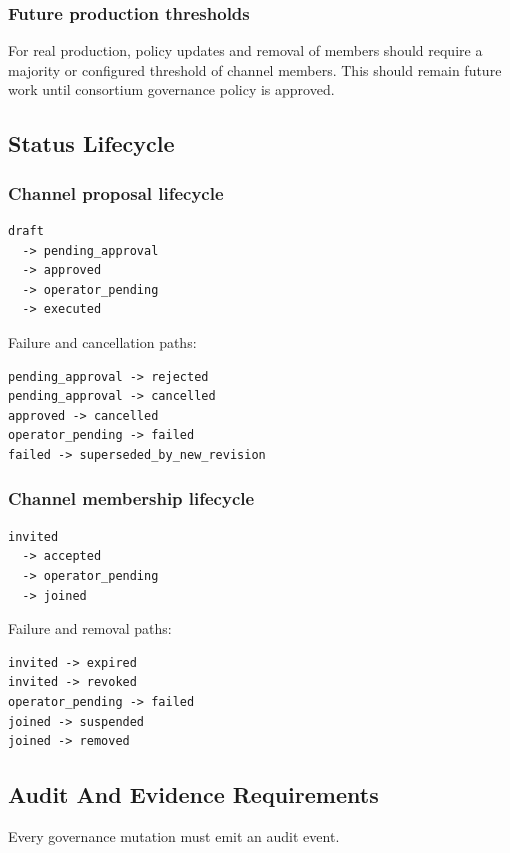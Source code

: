 \subsubsection{Future production thresholds}

For real production, policy updates and removal of members should require a majority or configured threshold of channel members. This should remain future work until consortium governance policy is approved.

\subsection{Status Lifecycle}

\subsubsection{Channel proposal lifecycle}

\begin{verbatim}
draft
  -> pending_approval
  -> approved
  -> operator_pending
  -> executed
\end{verbatim}

Failure and cancellation paths:

\begin{verbatim}
pending_approval -> rejected
pending_approval -> cancelled
approved -> cancelled
operator_pending -> failed
failed -> superseded_by_new_revision
\end{verbatim}

\subsubsection{Channel membership lifecycle}

\begin{verbatim}
invited
  -> accepted
  -> operator_pending
  -> joined
\end{verbatim}

Failure and removal paths:

\begin{verbatim}
invited -> expired
invited -> revoked
operator_pending -> failed
joined -> suspended
joined -> removed
\end{verbatim}

\subsection{Audit And Evidence Requirements}

Every governance mutation must emit an audit event.

